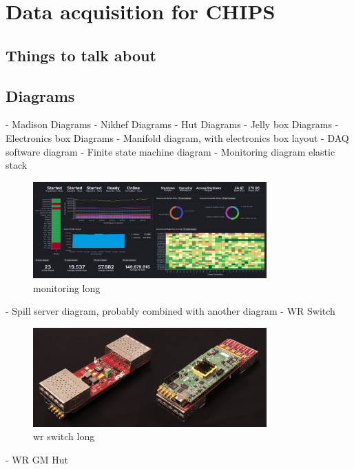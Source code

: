 \chapter{Data acquisition for CHIPS}
\label{chap:daq}


\section{Things to talk about}


\section{Diagrams}

- Madison Diagrams
- Nikhef Diagrams
- Hut Diagrams
- Jelly box Diagrams
- Electronics box Diagrams
- Manifold diagram, with electronics box layout
- DAQ software diagram
- Finite state machine diagram
- Monitoring diagram elastic stack
\begin{figure}
    \includegraphics[width=0.8\textwidth]{diagrams/5-daq/monitoring.png}
    \caption[monitoring short]{monitoring long}
    \label{fig:monitoring}
\end{figure}
- Spill server diagram, probably combined with another diagram
- WR Switch
\begin{figure}
    \includegraphics[width=0.8\textwidth]{diagrams/5-daq/wr_switch.jpg}
    \caption[wr switch short]{wr switch long}
    \label{fig:wr_switch}
\end{figure}
- WR GM Hut
